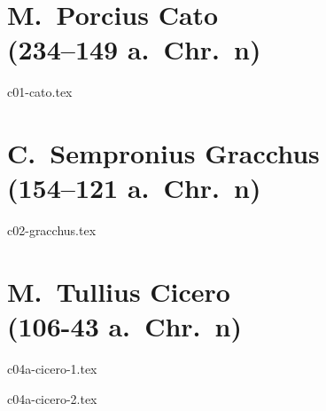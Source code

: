 \documentclass[a4paper,12pt,twoside]{report}
\begin{document}


\chapter[Cato]{M.\ Porcius Cato \\(234–149 a.~Chr.~n)}

{c01-cato.tex}

\chapter[C.\ Gracchus]{C.\ Sempronius Gracchus \\(154–121 a.~Chr.~n)}

{c02-gracchus.tex}

\chapter[Cicero]{M.\ Tullius Cicero \\(106-43 a.~Chr.~n)}

{c04a-cicero-1.tex}

{c04a-cicero-2.tex}



\end{document}
